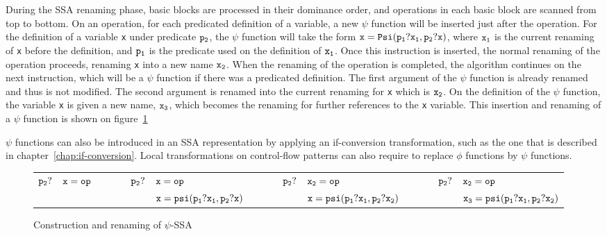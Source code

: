 During the SSA renaming phase, basic blocks are processed in their
dominance order, and operations in each basic block are scanned from
top to bottom. On an operation, for each predicated definition of a
variable, a new $\psi$ function will be inserted just after the
operation. For the definition of a variable {\tt x} under predicate
${\tt p_2}$, the $\psi$ function will take the form ${\tt x = Psi(p_1?x_1,
  p_2?x)}$, where ${\tt x_1}$ is the current renaming of {\tt x} before
the definition, and ${\tt p_1}$ is the predicate used on the definition of
${\tt x_1}$. Once this instruction is inserted, the normal renaming of
the operation proceeds, renaming {\tt x} into a new name ${\tt
  x_2}$. When the renaming of the operation is completed, the
algorithm continues on the next instruction, which will be a $\psi$
function if there was a predicated definition. The first argument of
the $\psi$ function is already renamed and thus is not modified. The
second argument is renamed into the current renaming for {\tt x}
which is ${\tt x_2}$. On the definition of the $\psi$ function, the
variable {\tt x} is given a new name, ${\tt x_3}$, which becomes the
renaming for further references to the {\tt x} variable. This
insertion and renaming of a $\psi$ function is shown on
figure~\ref{fig:psi_ssa_construct}

$\psi$ functions can also be introduced in an SSA representation by
applying an if-conversion transformation, such as the one that is
described in chapter~\ref{chap:if-conversion}. Local transformations
on control-flow patterns can also require to replace $\phi$ functions
by $\psi$ functions.

\begin{figure}
\begin{center}
\footnotesize
\begin{tabular}{lllllllllll}
${\tt p_2?}$ & ${\tt x = op}$ & \ \ \ \  & ${\tt p_2?}$ & ${\tt x = op}$                  & \ \ \ \  & ${\tt p_2?}$ & ${\tt x_2 = op}$               & \ \ \ \  & ${\tt p_2?}$ & ${\tt x_2 = op}$ \\
             &                &          &              & ${\tt x = psi(p_1?x_1, p_2?x)}$ &           &           & ${\tt x = psi(p_1?x_1, p_2?x_2)}$ &          &           & ${\tt x_3 = psi(p_1?x_1, p_2?x_2)}$ \\
\end{tabular}
\caption{Construction and renaming of $\psi$-SSA}
\label{fig:psi_ssa_construct}
\end{center}
\end{figure}


